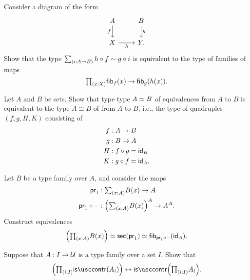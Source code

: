 \begin{exercises}
\begin{subexenum}
\end{subexenum}
\item \label{ex:sq_fib}Consider a diagram of the form
\begin{equation*}
\begin{tikzcd}
A \arrow[d,swap,"f"] & B \arrow[d,"g"] \\
X \arrow[r,swap,"h"] & Y.
\end{tikzcd}
\end{equation*}
Show that the type $\sm{i:A\to B}h\circ f\htpy g\circ i$ is equivalent to the type of families of maps
\begin{equation*}
\prd{x:X}\fib{f}{x}\to\fib{g}{h(x)}.
\end{equation*}
\item \label{ex:iso_equiv}Let $A$ and $B$ be sets. Show that type type $\eqv{A}{B}$ of equivalences from $A$ to $B$ is equivalent to the type $A\cong B$ of  from $A$ to $B$, i.e., the type of quadruples $(f,g,H,K)$ consisting of
\begin{align*}
f & : A\to B \\
g & : B\to A \\
H & : f\circ g = \idfunc[B] \\
K & : g\circ f = \idfunc[A].
\end{align*}
\item \label{ex:pi_sec}Let $B$ be a type family over $A$, and consider the maps
  \begin{align*}
    \proj 1 & : \sm{x:A} B(x)\to A \\
    \proj1 \circ \blank & : \Big(\sm{x:A} B(x)\Big)^A \to A^A.
  \end{align*}
  Construct equivalences
  \begin{equation*}
    \Big(\prd{x:A}B(x)\Big) \eqvsym \mathsf{sec}(\proj 1) \eqvsym \fib{\proj 1 \circ\blank}{\idfunc[A]}.
  \end{equation*}
\item Suppose that $A:I\to \UU$ is a type family over a set $I$. Show that
  \begin{equation*}
    \Big(\prd{i:I}\iscontr(A_i)\Big)\leftrightarrow \iscontr\Big(\prd{i:I}A_i\Big).
  \end{equation*}
\end{exercises}
